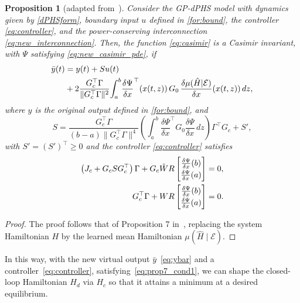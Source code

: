 \documentclass[letterpaper, 10 pt, conference]{ieeeconf}  %
\newtheorem{prop}{Proposition}
\begin{document}
\begin{prop}[adapted from~\cite{macchelli2015control}]\label{prop:2}
Consider the GP-dPHS model with dynamics given by \eqref{dPHSform}, boundary input $u$ defined in \eqref{for:bound}, the controller \eqref{eq:controller}, and the power-conserving interconnection \eqref{eq:new_interconnection}. Then, the function \eqref{eq:casimir} is a Casimir invariant, with $\Psi$ satisfying \eqref{eq:new_casimir_pde}, if
\begin{align}
\bar{y}(t) &= y(t) + S u(t)\label{eq:ybar}\\
&+ 2 \frac{G_c^\top \Gamma}{\|G_c^\top \Gamma\|^2}
\!\int_a^b\! 
\frac{\delta \Psi}{\delta x}^\top(x(t,z))\, G_0 \,
\frac{\delta \mu(\hat{H}|\mathcal{E})}{\delta x}(x(t,z)) \, dz,\notag
\end{align}
where $y$ is the original output defined in \eqref{for:bound}, and
\begin{equation}
S = \frac{G_c^\top \Gamma}{(b-a)\|G_c^\top \Gamma\|^4}
\left(
\int_a^b 
\frac{\delta \Psi}{\delta x}^\top G_0 \frac{\delta \Psi}{\delta x} \, dz
\right)
\Gamma^\top G_c + S',
\label{eq:S}
\end{equation}
with $S' = (S')^\top \geq 0$ and the controller \eqref{eq:controller} satisfies
\begin{align}
\begin{split}
\left(J_c + G_c S G_c^\top \right)\Gamma
+ G_c \tilde{W} R
\renewcommand*{\arraystretch}{1.2}
\begin{bmatrix}
\frac{\delta \Psi}{\delta x}(b) \\
\frac{\delta \Psi}{\delta x}(a)
\end{bmatrix}
&= 0, \label{eq:prop7_cond1} \\
G_c^\top \Gamma
+ W R
\renewcommand*{\arraystretch}{1.2}
\begin{bmatrix}
\frac{\delta \Psi}{\delta x}(b) \\
\frac{\delta \Psi}{\delta x}(a)
\end{bmatrix}
&= 0. 
\end{split}
\end{align}
\end{prop}
\begin{proof}
The proof follows that of Proposition 7 in~\cite{macchelli2015control}, replacing the system Hamiltonian \(H\) by the learned mean Hamiltonian \(\mu(\hat{H}\mid \mathcal{E})\).
\end{proof}
In this way, with the new virtual output $\bar{y}$~\cref{eq:ybar} and a controller~\cref{eq:controller}, satisfying~\cref{eq:prop7_cond1}, we can shape the closed-loop Hamiltonian $H_d$ via $H_c$ so that it attains a minimum at a desired equilibrium.
\end{document}
